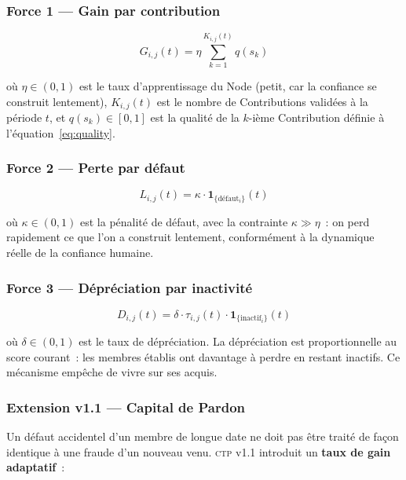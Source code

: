 \documentclass[12pt,a4paper]{article}
\theoremstyle{definition}
\theoremstyle{plain}
\theoremstyle{remark}
\newcommand{\CTP}{\textsc{ctp}}
\newcommand{\trustscore}{\tau}
\newcommand{\1}{\mathbf{1}}
\begin{document}
\subsubsection{Force 1 --- Gain par contribution}

\begin{equation}
G_{i,j}(t) = \eta \sum_{k=1}^{K_{i,j}(t)} q(s_k)
\label{eq:gain}
\end{equation}

où $\eta \in (0,1)$ est le taux d'apprentissage du Node (petit, car la
confiance se construit lentement), $K_{i,j}(t)$ est le nombre de Contributions
validées à la période $t$, et $q(s_k) \in [0,1]$ est la qualité de la
$k$-ième Contribution définie à l'équation~\eqref{eq:quality}.

\subsubsection{Force 2 --- Perte par défaut}

\begin{equation}
L_{i,j}(t) = \kappa \cdot \1_{\{\text{défaut}_i\}}(t)
\label{eq:loss}
\end{equation}

où $\kappa \in (0,1)$ est la pénalité de défaut, avec la contrainte
$\kappa \gg \eta$~: on perd rapidement ce que l'on a construit lentement,
conformément à la dynamique réelle de la confiance humaine.

\subsubsection{Force 3 --- Dépréciation par inactivité}

\begin{equation}
D_{i,j}(t) = \delta \cdot \trustscore_{i,j}(t) \cdot \1_{\{\text{inactif}_i\}}(t)
\label{eq:depreciation}
\end{equation}

où $\delta \in (0,1)$ est le taux de dépréciation. La dépréciation est
proportionnelle au score courant~: les membres établis ont davantage à perdre
en restant inactifs. Ce mécanisme empêche de vivre sur ses acquis.

\subsubsection{Extension v1.1 --- Capital de Pardon}

Un défaut accidentel d'un membre de longue date ne doit pas être traité
de façon identique à une fraude d'un nouveau venu. \CTP{} v1.1 introduit
un \textbf{taux de gain adaptatif}~:
\end{document}

